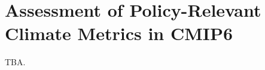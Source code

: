 


\chapter{Assessment of Policy-Relevant Climate Metrics in \acs{CMIP}6}
\label{ch:04:assessment_climate_metrics}

TBA.